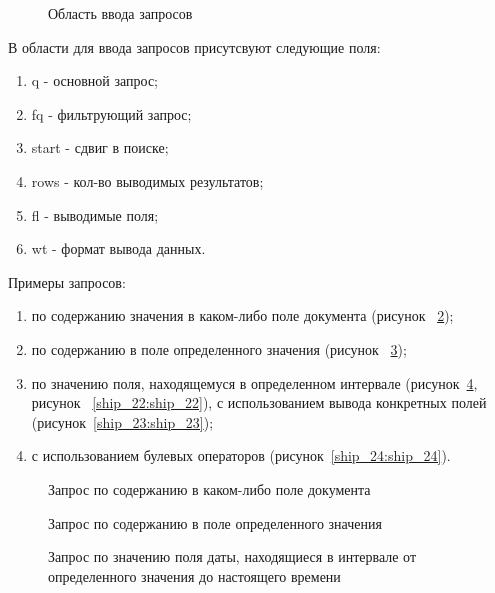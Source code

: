 \begin{figure}[h!]
\caption{Область ввода запросов}
\label{ship_18:ship_18}
\end{figure}

В области для ввода запросов присутсвуют следующие поля:
\begin{enumerate}
  \item q - основной запрос;
  \item fq - фильтрующий запрос;
  \item start - сдвиг в поиске;
  \item rows - кол-во выводимых результатов;
  \item fl - выводимые поля;
  \item wt - формат вывода данных.
\end{enumerate}

Примеры запросов:
\begin{enumerate}
  \item по содержанию значения в каком-либо поле документа (рисунок ~\ref{ship_19:ship_19});
  \item по содержанию в поле определенного значения (рисунок ~\ref{ship_20:ship_20});
  \item по значению поля, находящемуся в определенном интервале (рисунок~\ref{ship_21:ship_21}, рисунок ~\ref{ship_22:ship_22}), с использованием вывода конкретных полей (рисунок~\ref{ship_23:ship_23});
  \item с использованием булевых операторов (рисунок~\ref{ship_24:ship_24}).
\end{enumerate}

\begin{figure}[h!]
\caption{Запрос по содержанию в каком-либо поле документа}
\label{ship_19:ship_19}
\end{figure}

\begin{figure}[h!]
\caption{Запрос по содержанию в поле определенного значения}
\label{ship_20:ship_20}
\end{figure}

\begin{figure}[h!]
\caption{Запрос по значению поля даты, находящиеся в интервале от определенного значения до настоящего времени}
\label{ship_21:ship_21}
\end{figure}

